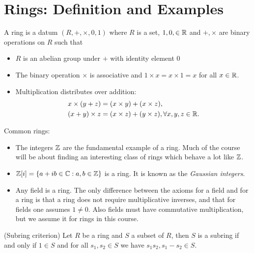 \setcounter{chapter}{0}
\chapter{Rings: Definition and Examples}
\begin{definition}
    A ring is a datum $(R, +, \times, 0, 1)$ where $R$ is a set, $1, 0, \in  \mathbb{R}$ and $+, \times$ are binary operations on $R$ such that
    \begin{itemize}
        \item $R$ is an abelian group under $+$ with identity element 0
        \item The binary operation $\times$ is associative and $1 \times x = x \times 1 = x$ for all $x \in  \mathbb{R}$.
        \item Multiplication distributes over addition:
            \[
            \begin{align*}
                x \times (y + z) &= (x \times y) + (x \times z),\\
                (x + y) \times z &= (x \times z) + (y \times z), \forall x, y, z \in  \mathbb{R}
            .\end{align*}
            \] 
    \end{itemize}
\end{definition}
\begin{eg}
    Common rings:
    \begin{itemize}
        \item The integers $\mathbb{Z}$ are the fundamental example of a ring. Much of the course will be about finding an interesting class of rings which behave a lot like $\mathbb{Z}$. 
        \item $\mathbb{Z}[i] = \{a + ib \in  \mathbb{C} : a, b \in  \mathbb{Z}\} $ is a ring. It is known as the \textit{Gaussian integers}. 
        \item Any field is a ring. The only difference between the axioms for a field and for a ring is that a ring does not require multiplicative inverses, and that for fields one assumes $1 \neq 0$. Also fields must have commutative multiplication, but we assume it for rings in this course.
    \end{itemize}
\end{eg}
\begin{lemma}(Subring criterion)
    Let $R$ be a ring and $S$ a subset of $R$, then $S$ is a subring if and only if $1 \in  S$ and for all $s_1, s_2 \in  S$ we have $s_1s_2, s_1-s_2 \in  S$.
\end{lemma}
 





